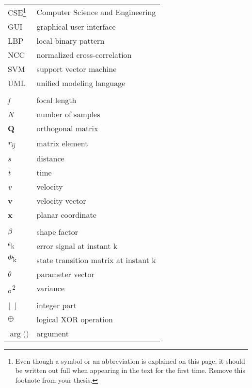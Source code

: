     {\newcommand{\headerabbreviations}{LYHENTEIDEN JA MERKKIEN SELITYKSET}}
    {\newcommand{\headerabbreviations}{LIST OF ABBREVIATIONS AND SYMBOLS}}
    
\header{\headerabbreviations}
\setlongtables
\begin{longtable}[l]{p{3cm}p{}}

    CSE\footnote{Even though a symbol or an abbreviation is explained on this page, it should be written out full when appearing in the text for the first time. Remove this footnote from your thesis.} & Computer Science and Engineering\\
    GUI & graphical user interface\\
    LBP & local binary pattern\\
    NCC & normalized cross-correlation\\
    SVM & support vector machine\\
    UML & unified modeling language \\
    \\
    \textit{f} & focal length\\
    \textit{N} & number of samples\\
    \textbf{Q} & orthogonal matrix \\
    \textit{r\textsubscript{ij}} & matrix element \\
    \textit{s} & distance \\
    \textit{t} & time \\
    \textit{v} & velocity \\
    \textbf{v} & velocity vector \\
    \textbf{x} & planar coordinate \\
    \\
    $\beta$ & shape factor \\
    $\epsilon$\textsubscript{k} & error signal at instant k \\
    \textbf{$\Phi$}\textsubscript{k} & state transition matrix at instant k \\
    \textbf{$\theta$} & parameter vector \\
    $\sigma$\textsuperscript{2} & variance \\
    \\
    $\lfloor$ $\rfloor$ & integer part \\
    $\oplus$ & logical XOR operation \\
    $\arg$() & argument \\

\end{longtable}
\setcounter{table}{0}


    {\newcommand{\biblanguage}{di_fin}}
    {\newcommand{\biblanguage}{di_eng}}